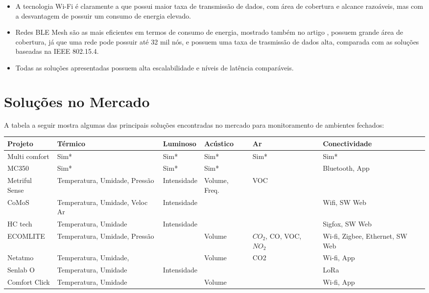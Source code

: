 \documentclass[../monografia.tex]{subfiles}
\begin{document}
\begin{itemize}
	\item A tecnologia Wi-Fi é claramente a que possui maior taxa de transmissão de dados, com área de cobertura e alcance razoáveis, mas com a desvantagem de possuir um consumo de energia elevado.
	\item Redes BLE Mesh são as mais eficientes em termos de consumo de energia, mostrado também no artigo \cite{zigbee-ble-power}, possuem grande área de cobertura, já que uma rede pode possuir até 32 mil nós\cite{BLE-mesh}, e possuem uma taxa de trasmissão de dados alta, comparada com as soluções baseadas na IEEE 802.15.4.
	\item Todas as soluções apresentadas possuem alta escalabilidade e níveis de latência comparáveis.
\end{itemize}


\section{Soluções no Mercado} 

A tabela a seguir mostra algumas das principais soluções encontradas no mercado para monitoramento de ambientes fechados: 

\begin{center}
\begin{tabular}{ | m{2.5cm} | m{2.4cm}| m{2.2cm} |m{2cm} |m{2cm} |m{2.8cm} | } 
\hline
\textbf{Projeto} & \textbf{Térmico} & \textbf{Luminoso} & \textbf{Acústico} & \textbf{Ar} & \textbf{Conectividade} \\ 
\hline
Multi comfort \cite{multicomfort} & Sim* & Sim* & Sim* & Sim* & Sim* \\ \hline
MC350\cite{mc350} & Sim* & Sim* & Sim* & & Bluetooth, App \\
\hline
Metriful Sense\cite{metriful} & Temperatura, Umidade, Pressão & Intensidade & Volume, Freq. & VOC &  \\ \hline
CoMoS\cite{CoMoS} & Temperatura, Umidade, Veloc Ar & Intensidade & & & Wifi, SW Web \\ \hline
HC tech\cite{HCTech} & Temperatura, Umidade & Intensidade & & & Sigfox, SW Web \\ \hline
ECOMLITE \cite{ECOMLITE} & Temperatura, Umidade, Pressão & & Volume & $CO_{2}$, CO, VOC, $NO_{2}$ & Wi-fi, Zigbee, Ethernet, SW Web \\ \hline
Netatmo\cite{netatmo} & Temperatura, Umidade, & & Volume & CO2 & Wi-fi, App \\ \hline
Senlab O\cite{Senlab} & Temperatura, Umidade & Intensidade & & & LoRa \\ \hline
Comfort Click\cite{comfortclick} & Temperatura, Umidade & & Volume & & Wi-fi, App  \\ \hline
\end{tabular}
\end{center}
\end{document}
